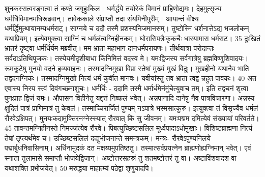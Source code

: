 शुनकस्सत्वरङ्गत्वा तं कण्ठे जगृहुःकिल।
 धर्मर्द्धये तयोरेकं विमानं प्राहिणोद्यमः।
 देहमुत्सृज्य धर्मर्धिविमानमधिरूढवान्।
 तावेककाले संप्राप्तौ तदा संयमिनीपुरीम्।
 आयान्तं वीक्ष्य धर्मर्द्धिमुत्थायानम्यधर्मराट्।
 साग्नये च ददौ तस्मै प्रशस्यनिजमानसम्।
 तुष्टोस्मि धर्शनात्तेऽद्य भजलोकन् यथाप्रियम्।
 इत्येवमुक्त्वा साग्निं च धर्मलंत्वग्निहीनकम्।
 घोरासिपत्रैःकृकचैः धारयामास धर्मराट।
 35 दुःखितं भ्रातरं दृष्ट्वा धर्मर्धिर्यम मब्रवीत्।
 मम भ्राता महाभाग दानधर्मपरायणः।
 तीर्थयात्रा परोदान्तः सर्वदाऽतिथिपूजकः।
 तस्येयमीदृशीबाधा किंनिमित्तं वदस्व मे।
 यमःद्विजस्य सर्वगात्रेषु ब्रह्मविष्णुशिवादयः।
 रूमकूटेषु मुनयो वदने हव्यवाहनः।
 तस्मादग्निमुखा विप्रा स्तेषां मुख्यं मुखं विदुः।
 मुखहीनो यथानैव भाति तद्वदनग्निकः।
 तस्मादग्निमुखो नित्यं धर्मं कुर्वीत मानवः।
 यवीयांस्तु तव भ्राता त्वद्व न्नहुत पावकः।
 40 अत एवास्य निरय स्त्वं दिवंगच्छमाशुचः।
 धर्मर्धिः -
ददामि तस्मै धर्मार्धमेनंमुंचेत्युवाच तम्।
 इति तद्वचनं शृत्वा पुनःप्राह द्विजं यमः।
 औपासन विहीनेतु यद्दत्तं निष्फलं भवेत्।
 अन्नपानादि दानेषु नैव पात्रविचारणा।
 अन्नस्य क्षुदितं पात्रं प्राणिमात्रं तु केवलं।
 तस्माच्चिरार्जितं पुण्यम् नऽपात्रे भस्मसात्कुरु।
 इत्युक्त्वा तं विसृज्यैव धर्मलं रौरवेऽक्षिपत्।
 मुनयःकदामुक्तिरनग्नेस्स्यात् रौरवात् किं सु जीवनम्।
 यमःपद्मम दमित्येवं संख्यायां परिवर्तते।
 45 तावन्तमग्निहीनस्ते निमज्जंत्येव रौरवे।
 पिबत्युच्छिष्टसलिल मूर्ध्वपादाऽधोमुखाः।
 विशिष्टब्राह्मणा नित्यं तेषां तृप्त्यर्थमेव च।
 उच्छिष्टसलिलं दद्युभॊजनान्ते समन्त्रकम्।
 मन्त्रः- रौरवेऽपुण्यनिलये पद्मार्बुधनिवासिनाम्।
 अर्धिनामुदकं दत मक्षय्यमुपतिष्ठतु।
 तस्मात्सर्वप्रयत्नेन ब्राह्मणोह्यग्निमान् भवेत्।
 एवं स्नाता तुलामासे समाप्तौ भोजयेद्विजान्।
 अष्टोत्तरसहस्रं तु शतमष्टोत्तरं तु वा।
 अष्टाविंशवादश वा यथाशक्ति प्रभोजयेत्।
 50 मरुद्धया माहात्म्यं पठेद्वा शृणुयादपि।
 
